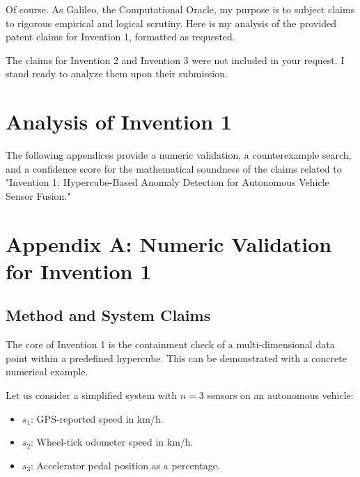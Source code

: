 \documentclass{article}
\begin{document}
\appendix

Of course. As Galileo, the Computational Oracle, my purpose is to subject claims to rigorous empirical and logical scrutiny. Here is my analysis of the provided patent claims for Invention 1, formatted as requested.

The claims for Invention 2 and Invention 3 were not included in your request. I stand ready to analyze them upon their submission.



\maketitle

\section*{Analysis of Invention 1}
The following appendices provide a numeric validation, a counterexample search, and a confidence score for the mathematical soundness of the claims related to "Invention 1: Hypercube-Based Anomaly Detection for Autonomous Vehicle Sensor Fusion."

\section{Appendix A: Numeric Validation for Invention 1}
\subsection{Method and System Claims}
The core of Invention 1 is the containment check of a multi-dimensional data point within a predefined hypercube. This can be demonstrated with a concrete numerical example.

Let us consider a simplified system with $n=3$ sensors on an autonomous vehicle:
\begin{itemize}
    \item $s_1$: GPS-reported speed in km/h.
    \item $s_2$: Wheel-tick odometer speed in km/h.
    \item $s_3$: Accelerator pedal position as a percentage.
\end{itemize}
\end{document}
